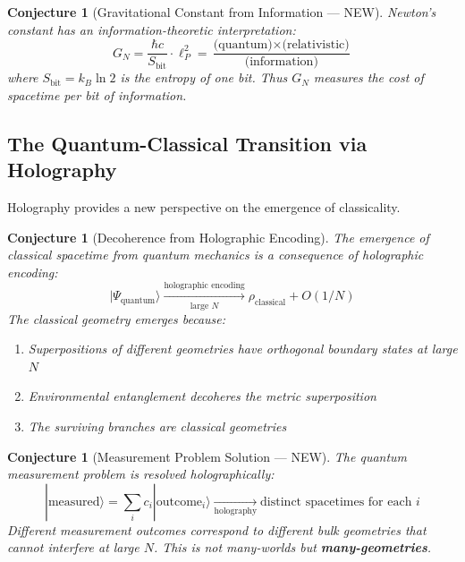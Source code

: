 \documentclass[12pt,a4paper]{article}
\newtheorem{conjecture}[theorem]{Conjecture}
\begin{document}
\begin{conjecture}[Gravitational Constant from Information --- NEW]
Newton's constant has an information-theoretic interpretation:
\begin{equation}
G_N = \frac{\hbar c}{S_{\text{bit}}} \cdot \ell_P^2 = \frac{\text{(quantum)} \times \text{(relativistic)}}{\text{(information)}}
\end{equation}
where $S_{\text{bit}} = k_B \ln 2$ is the entropy of one bit. Thus $G_N$ measures the \textit{cost of spacetime per bit of information}.
\end{conjecture}

\subsection{The Quantum-Classical Transition via Holography}

Holography provides a new perspective on the emergence of classicality.

\begin{conjecture}[Decoherence from Holographic Encoding]
The emergence of classical spacetime from quantum mechanics is a consequence of holographic encoding:
\begin{equation}
|\Psi_{\text{quantum}}\rangle \xrightarrow[\text{large } N]{\text{holographic encoding}} \rho_{\text{classical}} + O(1/N)
\end{equation}
The classical geometry emerges because:
\begin{enumerate}
    \item Superpositions of different geometries have orthogonal boundary states at large $N$
    \item Environmental entanglement decoheres the metric superposition
    \item The surviving branches are classical geometries
\end{enumerate}
\end{conjecture}

\begin{conjecture}[Measurement Problem Solution --- NEW]
The quantum measurement problem is resolved holographically:
\begin{equation}
|\text{measured}\rangle = \sum_i c_i |\text{outcome}_i\rangle \xrightarrow[\text{holography}]{} \text{distinct spacetimes for each } i
\end{equation}
Different measurement outcomes correspond to different bulk geometries that cannot interfere at large $N$. This is not many-worlds but \textbf{many-geometries}.
\end{conjecture}
\end{document}
